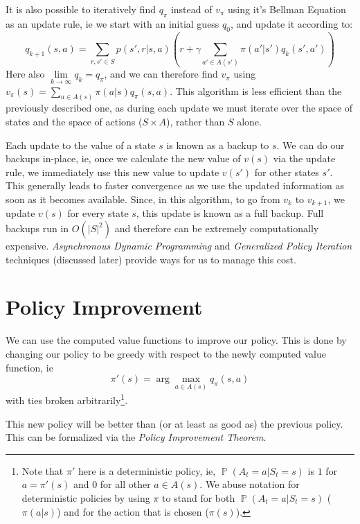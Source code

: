 \documentclass[12pt]{report}
\begin{document}
It is also possible to iteratively find $q_{\pi}$ instead of $v_{\pi}$ using it's Bellman Equation as an update rule, ie we start with an initial guess $q_{0}$, and update it according to:
\begin{equation}
    q_{k + 1}(s, a) = \sum\limits_{r, s' \in S} p(s', r | s, a)(r + \gamma\sum\limits_{a' \in A(s')}\pi(a' | s') q_{k}(s', a'))
\end{equation}
Here also $\lim\limits_{k \rightarrow \infty} q_{k} = q_{\pi}$, and we can therefore find $v_{\pi}$ using $v_{\pi}(s) = \sum\limits_{a \in A(s)} \pi(a | s) q_{\pi}(s, a)$. This algorithm is less efficient than the previously described one, as during each update we must iterate over the space of states and the space of actions ($S \times A$), rather than $S$ alone.

Each update to the value of a state $s$ is known as a backup to $s$. We can do our backups in-place, ie, once we calculate the new value of $v(s)$ via the update rule, we immediately use this new value to update $v(s')$ for other states $s'$. This generally leads to faster convergence as we use the updated information as soon as it becomes available.
Since, in this algorithm, to go from $v_{k}$ to $v_{k + 1}$, we update $v(s)$ for every state $s$, this update is known as a full backup. Full backups run in $O(\left|S\right|^{2})$ and therefore can be extremely computationally expensive. \textit{Asynchronous Dynamic Programming} and \textit{Generalized Policy Iteration} techniques (discussed later) provide ways for us to manage this cost.


\section{Policy Improvement}
We can use the computed value functions to improve our policy. This is done by changing our policy to be greedy with respect to the newly computed value function, ie 
\begin{equation}
    \pi'(s) = \arg\max\limits_{a \in A(s)} q_{\pi}(s, a)
\end{equation}
with ties broken arbitrarily\footnote{Note that $\pi'$ here is a deterministic policy, ie, $\mathop{\mathbb{P}}(A_{t} = a | S_{t} = s)$ is $1$ for $a = \pi'(s)$ and $0$ for all other $a \in A(s)$. We abuse notation for deterministic policies by using $\pi$ to stand for both $\mathop{\mathbb{P}}(A_{t} = a | S_{t} = s)$ ($\pi(a | s)$) and for the action that is chosen ($\pi(s)$).}.

This new policy will be better than (or at least as good as) the previous policy. This can be formalized via the \textit{Policy Improvement Theorem}.
\end{document}

